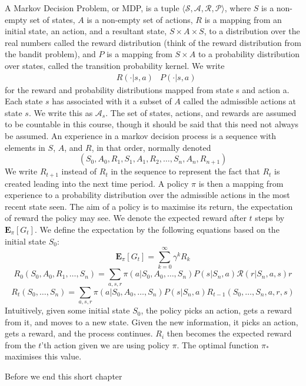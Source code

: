 A Markov Decision Problem, or MDP, is a tuple $\langle \mathcal{S}, \mathcal{A}, \mathcal{R}, \mathcal{P} \rangle$, where $S$ is a non-empty set of states, $A$ is a non-empty set of actions, $R$ is a mapping from an initial state, an action, and a resultant state, $S \times A \times S$, to a distribution over the real numbers called the reward distribution (think of the reward distribution from the bandit problem), and $P$ is a mapping from $S \times A$ to a probability distribution over states, called the transition probability kernel. We write
%
\begin{align*} &R(\cdotp | s, a) &P(\cdotp | s,a) \end{align*}
%
for the reward and probability distributions mapped from state s and action a. Each state $s$ has associated with it a subset of $A$ called the admissible actions at state $s$. We write this as $\mathcal{A}_s$. The set of states, actions, and rewards are assumed to be countable in this course, though it should be said that this need not always be assumed. An experience in a markov decision process is a sequence with elements in $S$, $A$, and $R$, in that order, normally denoted
%
\[ (S_0, A_0, R_1, S_1, A_1, R_2, \dots, S_n, A_n, R_{n+1}) \]
%
We write $R_{t+1}$ instead of $R_t$ in the sequence to represent the fact that $R_t$ is created leading into the next time period. A policy $\pi$ is then a mapping from experience to a probability distribution over the admissible actions in the most recent state seen. The aim of a policy is to maximise its return, the expectation of reward the policy may see. We denote the expected reward after $t$ steps by $\mathbf{E}_\pi[G_t]$. We define the expectation by the following equations based on the initial state $S_0$:
%
\[ \mathbf{E}_\pi[G_t] = \sum_{k = 0}^{\infty} \gamma^k R_k \]
%
\[ R_0(S_0,A_0,R_1,\dots,S_n) = \sum_{a,s,r}\pi(a|S_0,A_0,\dots,S_n) P(s|S_n,a) \mathcal{R}(r|S_n,a,s)r \]
%
\[ R_t(S_0, \dots, S_n) = \sum_{a,s,r}\pi(a|S_0,A_0,\dots,S_n) P(s|S_n,a) R_{t-1}(S_0, \dots, S_n, a, r, s) \]
%
Intuitively, given some initial state $S_0$, the policy picks an action, gets a reward from it, and moves to a new state. Given the new information, it picks an action, gets a reward, and the process continues. $R_i$ then becomes the expected reward from the $t$'th action given we are using policy $\pi$. The optimal function $\pi_*$ maximises this value.

Before we end this short chapter

